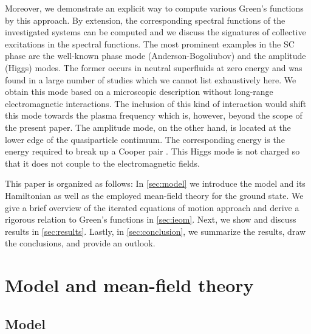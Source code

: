 \documentclass[
    reprint, 
    aps,
    preprintnumbers,
    twocolumn,
    prb,
    superscriptaddress
]{revtex4-2}
\begin{document}
Moreover, we demonstrate an explicit way to compute various Green's functions by this approach.
By extension, the corresponding spectral functions of the investigated systems can be computed and 
we discuss the signatures of collective excitations in the spectral functions. 
The most prominent examples in the SC phase are the well-known phase mode (Anderson-Bogoliubov) and 
the amplitude (Higgs) modes. The former occurs in neutral superfluids at zero energy and was found
in a large number of studies \cite{Bogoljubov1958,Anderson58,Brieskorn74,Schmid1975,simanek1975,schon76,Maiti2015,Sun2020,Fan22} which we cannot list exhaustively here.
We obtain this mode based on a microscopic description without long-range electromagnetic interactions.
The inclusion of this kind of interaction would shift this mode towards the plasma frequency 
\cite{Anderson58,schon76,Kulik1981} which is, however, beyond the scope of the present paper. 
The amplitude mode, on the other hand, is located at the lower edge of the quasiparticle continuum.
The corresponding energy is the energy required to break up a Cooper pair 
\cite{Schmid1975,Varma02,Cea14,Measson14,Tsuji15,Krull16,Mueller2019,Schwarz20}.
This Higgs mode is not charged so that it does not couple to the electromagnetic fields.

This paper is organized as follows:
In \autoref{sec:model} we introduce the model and its Hamiltonian as well as the employed mean-field theory for the ground state.
We give a brief overview of the iterated equations of motion approach and 
derive a rigorous relation to Green's functions in \autoref{sec:ieom}.
Next, we show and discuss results in \autoref{sec:results}.
Lastly, in \autoref{sec:conclusion}, we summarize the results, draw the conclusions, and provide
an outlook.

\section{Model and mean-field theory}\label{sec:model}

\subsection{Model}
\end{document}
